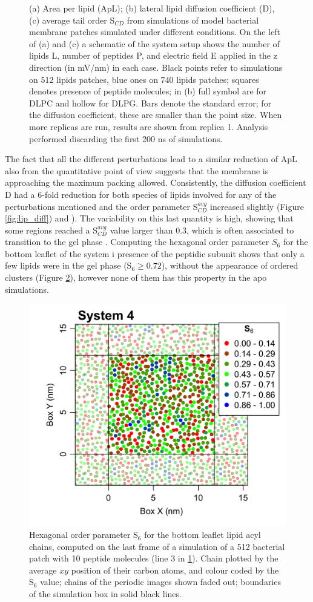 \begin{figure}
\caption[ApL, D and S$_{CD}$ for membrane simulations]{(a) Area per lipid (ApL); (b) lateral lipid diffusion coefficient (D), (c) average tail order S$_{CD}$ from simulations of model bacterial membrane patches simulated under different conditions. On the left of (a) and (c) a schematic of the system setup shows the number of lipids L, number of peptides P, and electric field E applied in the z direction (in mV/nm) in each case. Black points refer to simulations on 512 lipids patches, blue ones on 740 lipids patches; squares denotes presence of peptide molecules; in (b) full symbol are for DLPC and hollow for DLPG. Bars denote the standard error; for the diffusion coefficient, these are smaller than the point size. When more replicas are run, results are shown from replica 1. Analysis performed discarding the first 200 ns of simulations.}
\label{fig:lipids_ApL_D}
\end{figure}

The fact that all the different perturbations lead to a similar reduction of ApL also from the quantitative point of view suggests that the membrane is approaching the maximum packing allowed.
%
Consistently, the diffusion coefficient D had a 6-fold reduction for both species of lipids involved for any of the perturbations mentioned and the order parameter S$^{avg}_{CD}$ increased slightly (Figure \ref{fig:lip_diff}) and ). The variability on this last quantity is high, showing that some regions reached a S$^{avg}_{CD}$ value larger than 0.3, which is often associated to transition to the gel phase \cite{Pluhackova2016}.
%
Computing the hexagonal order parameter $S_6$ for the bottom leaflet of the system i presence of the peptidic subunit shows that only a few lipids were in the gel phase (S$_6 \ge 0.72$), without the appearance of ordered clusters (Figure \ref{fig:S6_pb4}), however none of them has this property in the apo simulations.
%
\begin{figure}[h!]
\centering
\includegraphics[width=0.5\linewidth]{3results_capsule/pics/pb4_S6.png} 
\caption[Hexagonal order parameter of lipids in protein-lipid simulation]{Hexagonal order parameter S$_6$ for the bottom leaflet lipid acyl chains, computed on the last frame of a simulation of a 512 bacterial patch with 10 peptide molecules (line 3 in \ref{fig:lipids_ApL_D}). Chain plotted by the average $xy$ position of their carbon atoms, and colour coded by the S$_6$ value; chains of the periodic images shown faded out; boundaries of the simulation box in solid black lines.}
\label{fig:S6_pb4}
\end{figure}

